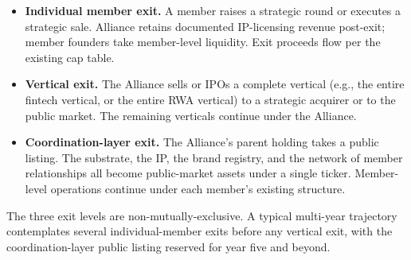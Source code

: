 \begin{itemize}[leftmargin=2em,itemsep=0.1em]
\item \textbf{Individual member exit.} A member raises a strategic round
or executes a strategic sale. Alliance retains documented IP-licensing
revenue post-exit; member founders take member-level liquidity. Exit
proceeds flow per the existing cap table.
\item \textbf{Vertical exit.} The Alliance sells or IPOs a complete
vertical (e.g., the entire fintech vertical, or the entire RWA
vertical) to a strategic acquirer or to the public market. The
remaining verticals continue under the Alliance.
\item \textbf{Coordination-layer exit.} The Alliance's parent holding
takes a public listing. The substrate, the IP, the brand registry,
and the network of member relationships all become public-market
assets under a single ticker. Member-level operations continue under
each member's existing structure.
\end{itemize}

The three exit levels are non-mutually-exclusive. A typical multi-year
trajectory contemplates several individual-member exits before any
vertical exit, with the coordination-layer public listing reserved for
year five and beyond.
